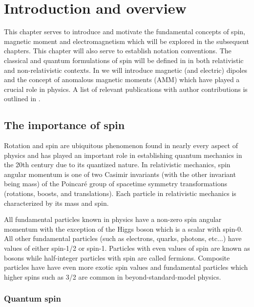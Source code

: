 \chapter{Introduction and overview}
\label{chap:intro}
\noindent This chapter serves to introduce and motivate the fundamental concepts of spin, magnetic moment and electromagnetism which will be explored in the subsequent chapters. This chapter will also serve to establish notation conventions. The classical and quantum formulations of spin will be defined in  in both relativistic and non-relativistic contexts. In  we will introduce magnetic (and electric) dipoles and the concept of anomalous magnetic moments (AMM) which have played a crucial role in physics. A list of relevant publications with author contributions is outlined in .

\section{The importance of spin}
\label{sec:spin}
Rotation and spin are ubiquitous phenomenon found in nearly every aspect of physics and has played an important role in establishing quantum mechanics in the 20th century due to its quantized nature. In relativistic mechanics, spin angular momentum is one of two Casimir invariants (with the other invariant being mass) of the Poincar{\'e} group of spacetime symmetry transformations (rotations, boosts, and translations). Each particle in relativistic mechanics is characterized by its mass and spin.

All fundamental particles known in physics have a non-zero spin angular momentum with the exception of the Higgs boson which is a scalar with spin-0. All other fundamental particles (such as electrons, quarks, photons, etc...) have values of either spin-1/2 or spin-1. Particles with even values of spin are known as bosons while half-integer particles with spin are called fermions. Composite particles have have even more exotic spin values and fundamental particles which higher spins such as 3/2 are common in beyond-standard-model physics.

\subsection{Quantum spin}
\label{sec:qspin}

